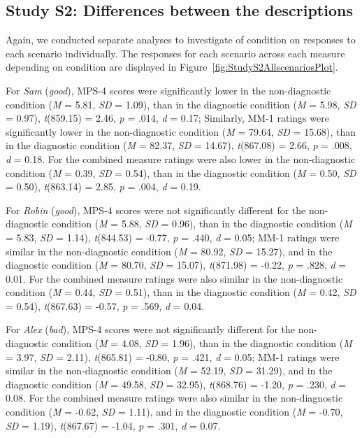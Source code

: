 \documentclass[
  man,floatsintext]{apa6}
\begin{document}
\subsection{Study S2: Differences between the descriptions}\label{study-s2-differences-between-the-descriptions}

Again, we conducted separate analyses to investigate of condition on responses to each scenario individually. The responses for each scenario across each measure depending on condition are displayed in Figure~\ref{fig:StudyS2AllscenariosPlot}.

For \emph{Sam} (\emph{good}), MPS-4 scores were significantly lower in the non-diagnostic condition (\emph{M} = 5.81, \emph{SD} = 1.09), than in the diagnostic condition (\emph{M} = 5.98, \emph{SD} = 0.97), \emph{t}(859.15) = 2.46, \emph{p} = .014, \emph{d} = 0.17; Similarly, MM-1 ratings were significantly lower in the non-diagnostic condition (\emph{M} = 79.64, \emph{SD} = 15.68), than in the diagnostic condition (\emph{M} = 82.37, \emph{SD} = 14.67), \emph{t}(867.08) = 2.66, \emph{p} = .008, \emph{d} = 0.18. For the combined measure ratings were also lower in the non-diagnostic condition (\emph{M} = 0.39, \emph{SD} = 0.54), than in the diagnostic condition (\emph{M} = 0.50, \emph{SD} = 0.50), \emph{t}(863.14) = 2.85, \emph{p} = .004, \emph{d} = 0.19.

For \emph{Robin} (\emph{good}), MPS-4 scores were not significantly different for the non-diagnostic condition (\emph{M} = 5.88, \emph{SD} = 0.96), than in the diagnostic condition (\emph{M} = 5.83, \emph{SD} = 1.14), \emph{t}(844.53) = -0.77, \emph{p} = .440, \emph{d} = 0.05; MM-1 ratings were similar in the non-diagnostic condition (\emph{M} = 80.92, \emph{SD} = 15.27), and in the diagnostic condition (\emph{M} = 80.70, \emph{SD} = 15.07), \emph{t}(871.98) = -0.22, \emph{p} = .828, \emph{d} = 0.01. For the combined measure ratings were also similar in the non-diagnostic condition (\emph{M} = 0.44, \emph{SD} = 0.51), than in the diagnostic condition (\emph{M} = 0.42, \emph{SD} = 0.54), \emph{t}(867.63) = -0.57, \emph{p} = .569, \emph{d} = 0.04.

For \emph{Alex} (\emph{bad}), MPS-4 scores were not significantly different for the non-diagnostic condition (\emph{M} = 4.08, \emph{SD} = 1.96), than in the diagnostic condition (\emph{M} = 3.97, \emph{SD} = 2.11), \emph{t}(865.81) = -0.80, \emph{p} = .421, \emph{d} = 0.05; MM-1 ratings were similar in the non-diagnostic condition (\emph{M} = 52.19, \emph{SD} = 31.29), and in the diagnostic condition (\emph{M} = 49.58, \emph{SD} = 32.95), \emph{t}(868.76) = -1.20, \emph{p} = .230, \emph{d} = 0.08. For the combined measure ratings were also similar in the non-diagnostic condition (\emph{M} = -0.62, \emph{SD} = 1.11), and in the diagnostic condition (\emph{M} = -0.70, \emph{SD} = 1.19), \emph{t}(867.67) = -1.04, \emph{p} = .301, \emph{d} = 0.07.
\end{document}
